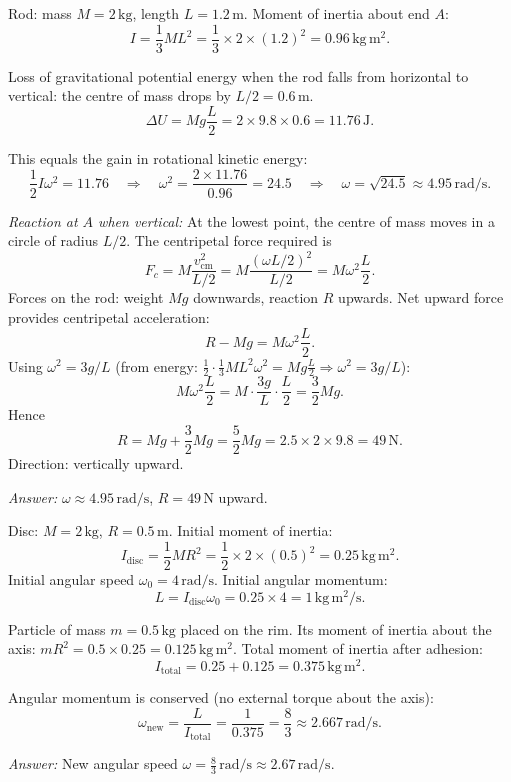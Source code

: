\documentclass[11pt]{article}
\begin{document}
\begin{corrige}
Rod: mass \(M = 2\,\mathrm{kg}\), length \(L = 1.2\,\mathrm{m}\). Moment of inertia about end \(A\):
\[
I = \frac{1}{3} M L^2 = \frac{1}{3} \times 2 \times (1.2)^2 = 0.96\,\mathrm{kg\,m^2}.
\]

Loss of gravitational potential energy when the rod falls from horizontal to vertical: the centre of mass drops by \(L/2 = 0.6\,\mathrm{m}\).
\[
\Delta U = M g \frac{L}{2} = 2 \times 9.8 \times 0.6 = 11.76\,\mathrm{J}.
\]

This equals the gain in rotational kinetic energy:
\[
\frac{1}{2} I \omega^2 = 11.76 \quad\Rightarrow\quad \omega^2 = \frac{2 \times 11.76}{0.96} = 24.5 \quad\Rightarrow\quad \omega = \sqrt{24.5} \approx 4.95\,\mathrm{rad/s}.
\]

\emph{Reaction at \(A\) when vertical:}
At the lowest point, the centre of mass moves in a circle of radius \(L/2\). The centripetal force required is
\[
F_c = M \frac{v_{\mathrm{cm}}^2}{L/2} = M \frac{(\omega L/2)^2}{L/2} = M \omega^2 \frac{L}{2}.
\]
Forces on the rod: weight \(Mg\) downwards, reaction \(R\) upwards. Net upward force provides centripetal acceleration:
\[
R - Mg = M \omega^2 \frac{L}{2}.
\]
Using \(\omega^2 = 3g/L\) (from energy: \(\frac{1}{2} \cdot \frac{1}{3}ML^2 \omega^2 = Mg\frac{L}{2} \Rightarrow \omega^2 = 3g/L\)):
\[
M \omega^2 \frac{L}{2} = M \cdot \frac{3g}{L} \cdot \frac{L}{2} = \frac{3}{2}Mg.
\]
Hence
\[
R = Mg + \frac{3}{2}Mg = \frac{5}{2}Mg = 2.5 \times 2 \times 9.8 = 49\,\mathrm{N}.
\]
Direction: vertically upward.

\emph{Answer:} \(\omega \approx 4.95\,\mathrm{rad/s}\), \(R = 49\,\mathrm{N}\) upward.
\end{corrige}

\begin{corrige}
Disc: \(M = 2\,\mathrm{kg}\), \(R = 0.5\,\mathrm{m}\). Initial moment of inertia:
\[
I_{\mathrm{disc}} = \frac{1}{2} M R^2 = \frac{1}{2} \times 2 \times (0.5)^2 = 0.25\,\mathrm{kg\,m^2}.
\]
Initial angular speed \(\omega_0 = 4\,\mathrm{rad/s}\). Initial angular momentum:
\[
L = I_{\mathrm{disc}} \omega_0 = 0.25 \times 4 = 1\,\mathrm{kg\,m^2/s}.
\]

Particle of mass \(m = 0.5\,\mathrm{kg}\) placed on the rim. Its moment of inertia about the axis: \(m R^2 = 0.5 \times 0.25 = 0.125\,\mathrm{kg\,m^2}\).
Total moment of inertia after adhesion:
\[
I_{\mathrm{total}} = 0.25 + 0.125 = 0.375\,\mathrm{kg\,m^2}.
\]

Angular momentum is conserved (no external torque about the axis):
\[
\omega_{\mathrm{new}} = \frac{L}{I_{\mathrm{total}}} = \frac{1}{0.375} = \frac{8}{3} \approx 2.667\,\mathrm{rad/s}.
\]

\emph{Answer:} New angular speed \(\omega = \frac{8}{3}\,\mathrm{rad/s} \approx 2.67\,\mathrm{rad/s}\).
\end{corrige}
\end{document}
